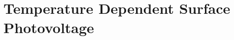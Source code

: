 \documentclass[
11pt, %
english, %
singlespacing, %
]{MyMastersThesis} %
\begin{document}
\frontmatter
\pagestyle{plain}
	

\mainmatter
\pagestyle{thesis}
	\chapter{Temperature Dependent Surface Photovoltage}
	\label{chap:spv}
	

\appendix
	
	
\end{document}

